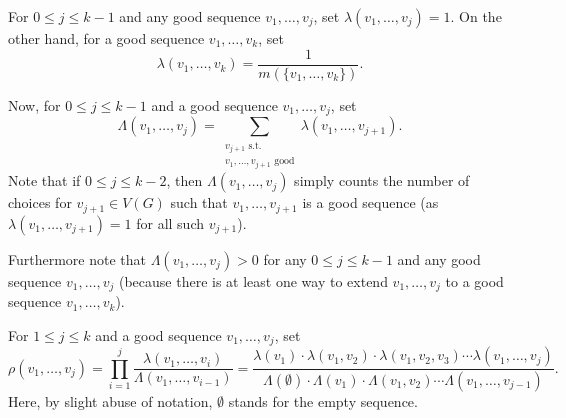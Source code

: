 \documentclass[11pt]{article}
\theoremstyle{definition}
\numberwithin{equation}{section}
\begin{document}
For $0\leq j\leq k-1$ and any good sequence $v_1,\dots,v_j$, set $\lambda(v_1,\dots,v_j)=1$. On the other hand, for a good sequence $v_1,\dots,v_k$, set
\[\lambda(v_1,\dots,v_k)=\frac{1}{m(\lbrace v_1,\dots,v_k\rbrace)}.\]

Now, for $0\leq j\leq k-1$ and a good sequence $v_1,\dots,v_j$, set
\[\Lambda(v_1,\dots,v_j)=\sum_{\substack{v_{j+1}\text{ s.t. }\\v_1,\dots,v_{j+1}\text{ good}}}\lambda(v_1,\dots,v_{j+1}).\]
Note that if $0\leq j\leq k-2$, then $\Lambda(v_1,\dots,v_j)$ simply counts the number of choices for $v_{j+1}\in V(G)$ such that $v_1,\dots,v_{j+1}$ is a good sequence (as $\lambda(v_1,\dots,v_{j+1})=1$ for all such $v_{j+1}$).

Furthermore note that $\Lambda(v_1,\dots,v_j)>0$ for any $0\leq j\leq k-1$ and any good sequence $v_1,\dots,v_j$ (because there is at least one way to extend $v_1,\dots,v_j$ to a good sequence $v_1,\dots,v_k$).

For $1\leq j\leq k$ and a good sequence $v_1,\dots,v_j$, set
\[\rho(v_1,\dots,v_j)=\prod_{i=1}^{j}\frac{\lambda(v_1,\dots,v_i)}{\Lambda(v_1,\dots,v_{i-1})}=\frac{\lambda(v_1)\cdot \lambda(v_1,v_2)\cdot \lambda(v_1,v_2,v_3)\dotsm \lambda(v_1,\dots,v_j)}{\Lambda(\emptyset)\cdot \Lambda(v_1)\cdot \Lambda(v_1, v_2)\dotsm \Lambda(v_1,\dots,v_{j-1})}.\]
Here, by slight abuse of notation, $\emptyset$ stands for the empty sequence.
\end{document}
